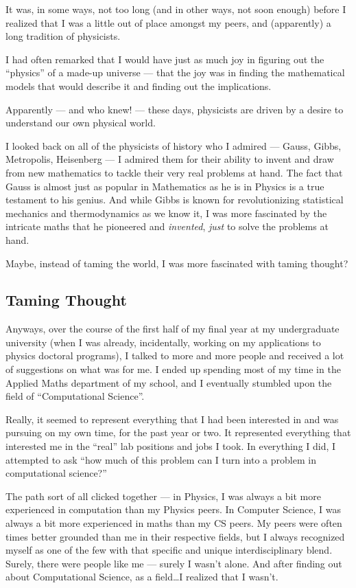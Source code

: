 \documentclass[]{article}
\begin{document}
It was, in some ways, not too long (and in other ways, not soon enough) before I realized that I was
a little out of place amongst my peers, and (apparently) a long tradition of physicists.

I had often remarked that I would have just as much joy in figuring out the ``physics'' of a made-up
universe --- that the joy was in finding the mathematical models that would describe it and finding
out the implications.

Apparently --- and who knew! --- these days, physicists are driven by a desire to understand our own
physical world.

I looked back on all of the physicists of history who I admired --- Gauss, Gibbs, Metropolis,
Heisenberg --- I admired them for their ability to invent and draw from new mathematics to tackle
their very real problems at hand. The fact that Gauss is almost just as popular in Mathematics as he
is in Physics is a true testament to his genius. And while Gibbs is known for revolutionizing
statistical mechanics and thermodynamics as we know it, I was more fascinated by the intricate maths
that he pioneered and \emph{invented}, \emph{just} to solve the problems at hand.

Maybe, instead of taming the world, I was more fascinated with taming thought?

\subsection{Taming Thought}\label{taming-thought}

Anyways, over the course of the first half of my final year at my undergraduate university (when I
was already, incidentally, working on my applications to physics doctoral programs), I talked to
more and more people and received a lot of suggestions on what was for me. I ended up spending most
of my time in the Applied Maths department of my school, and I eventually stumbled upon the field of
``Computational Science''.

Really, it seemed to represent everything that I had been interested in and was pursuing on my own
time, for the past year or two. It represented everything that interested me in the ``real'' lab
positions and jobs I took. In everything I did, I attempted to ask ``how much of this problem can I
turn into a problem in computational science?''

The path sort of all clicked together --- in Physics, I was always a bit more experienced in
computation than my Physics peers. In Computer Science, I was always a bit more experienced in maths
than my CS peers. My peers were often times better grounded than me in their respective fields, but
I always recognized myself as one of the few with that specific and unique interdisciplinary blend.
Surely, there were people like me --- surely I wasn't alone. And after finding out about
Computational Science, as a field\ldots{}I realized that I wasn't.
\end{document}

